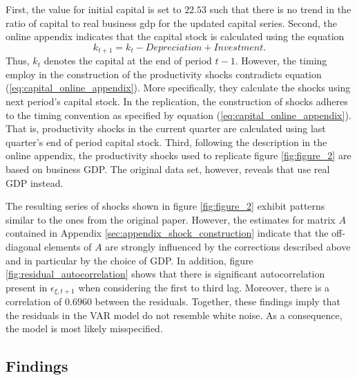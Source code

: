 First, the value for initial capital is set to $22.53$ such that there is no trend in the ratio of capital to real business gdp for the updated capital series. Second, the online appendix indicates that the capital stock is calculated using the equation
\begin{equation} 
	\label{eq:capital_online_appendix}
	k_{t+1} = k_{t} - Depreciation + Investment.
\end{equation} 
Thus, ${k}_t$ denotes the capital at the end of period $t-1$. However, the timing \citeauthor{JERMANNfinancial} employ in the construction of the productivity shocks contradicts equation (\ref{eq:capital_online_appendix}). More specifically, they calculate the shocks using next period's capital stock. In the replication, the construction of shocks adheres to the timing convention as specified by equation (\ref{eq:capital_online_appendix}). That is, productivity shocks in the current quarter are calculated using last quarter's end of period capital stock. Third, following the description in the online appendix, the productivity shocks used to replicate figure \ref{fig:figure_2} are based on business GDP. The original data set, however, reveals that \citeauthor{JERMANNfinancial} use real GDP instead. 

The resulting series of shocks shown in figure \ref{fig:figure_2} exhibit patterns similar to the ones from the original paper. However, the estimates for matrix $A$ contained in Appendix \ref{sec:appendix_shock_construction} indicate that the off-diagonal elements of $A$ are strongly influenced by the corrections described above and in particular by the choice of GDP. In addition, figure \ref{fig:residual_autocorrelation} shows that there is significant autocorrelation present in ${\epsilon}_{\xi,t+1}$ when considering the first to third lag. Moreover, there is a correlation of $0.6960$ between the residuals. Together, these findings imply that the residuals in the VAR model do not resemble white noise. As a consequence, the model is most likely misspecified.


\subsection{Findings}
\label{sec:findings}



